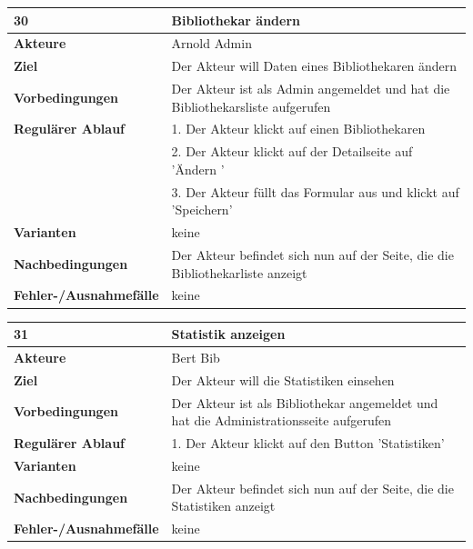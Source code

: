 \documentclass[fontsize=12pt,paper=a4,twoside]{scrartcl}
\begin{document}
\begin{table}[htbp]
\label{30}
\begin{tabular}{|l|p{10cm}|}
\hline 
\textbf{30} & \textbf{Bibliothekar ändern} \\ \hline
\textbf{Akteure} & Arnold Admin\\ \hline
\textbf{Ziel} & Der Akteur will Daten eines Bibliothekaren ändern \\ \hline
\textbf{Vorbedingungen} & Der Akteur ist als Admin angemeldet und hat die Bibliothekarsliste aufgerufen \\ \hline
\textbf{Regulärer Ablauf} & 
1. Der Akteur klickt auf einen Bibliothekaren \\
&2. Der Akteur klickt auf der Detailseite auf 'Ändern '\\
&3. Der Akteur füllt das Formular aus und klickt auf 'Speichern'\\
\hline
\textbf{Varianten} & 
keine \\ \hline
\textbf{Nachbedingungen} & Der Akteur befindet sich nun auf der Seite, die die Bibliothekarliste anzeigt\\ \hline
\textbf{Fehler-/Ausnahmefälle} & keine\\
\hline
\end{tabular}
\end{table}


\begin{table}[htbp]
\label{31}
\begin{tabular}{|l|p{10cm}|}
\hline 
\textbf{31} & \textbf{Statistik anzeigen} \\ \hline
\textbf{Akteure} & Bert Bib\\ \hline
\textbf{Ziel} & Der Akteur will die Statistiken einsehen \\ \hline
\textbf{Vorbedingungen} & Der Akteur ist als Bibliothekar angemeldet und hat die Administrationsseite aufgerufen \\ \hline
\textbf{Regulärer Ablauf} & 
1. Der Akteur klickt auf den Button 'Statistiken' \\
\hline
\textbf{Varianten} & 
keine \\ \hline
\textbf{Nachbedingungen} & Der Akteur befindet sich nun auf der Seite, die die Statistiken anzeigt\\ \hline
\textbf{Fehler-/Ausnahmefälle} & keine\\
\hline
\end{tabular}
\end{table}
\end{document}
